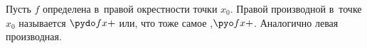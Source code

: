 
Пусть $f$ определена в~правой окрестности точки $x_0$.
Правой производной в~точке $x_0$ называется $\pydo fx+$ или, что тоже самое ,$\pyo fx+$. Аналогично левая производная.
